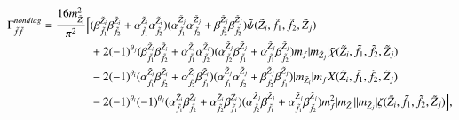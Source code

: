 \documentclass[final,3p,times]{elsarticle}
\begin{document}
\begin{equation}
\begin{aligned}
\Gamma_{\tilde{f} \tilde{f}}^{nondiag} =  {16 m_{\tilde{Z}_i}^2 \over \pi^2}\Big[&({\beta_{\tilde{f}_1}^{\tilde{Z}_i}}{\beta_{\tilde{f}_2}^{\tilde{Z}_i}} + {\alpha_{\tilde{f}_1}^{\tilde{Z}_i}}{\alpha_{\tilde{f}_2}^{\tilde{Z}_i}})({\alpha_{\tilde{f}_1}^{\tilde{Z}_j}}{\alpha_{\tilde{f}_2}^{\tilde{Z}_j}} + {\beta_{\tilde{f}_2}^{\tilde{Z}_j}}{\beta_{\tilde{f}_2}^{\tilde{Z}_j}})\tilde{\psi}(\tilde{Z}_i,\tilde{f}_1, \tilde{f}_2, \tilde{Z}_j) \\ & + 2(-1)^{\theta_j}({\beta_{\tilde{f}_1}^{\tilde{Z}_i}}{\beta_{\tilde{f}_2}^{\tilde{Z}_i}} + {\alpha_{\tilde{f}_1}^{\tilde{Z}_i}} {\alpha_{\tilde{f}_2}^{\tilde{Z}_i}})({\alpha_{\tilde{f}_2}^{\tilde{Z}_j}}{\beta_{\tilde{f}_1}^{\tilde{Z}_j}} + {\alpha_{\tilde{f}_1}^{\tilde{Z}_j}}{\beta_{\tilde{f}_2}^{\tilde{Z}_j}})m_{f} |m_{\tilde{Z}_j}| \tilde{\chi}(\tilde{Z}_i,\tilde{f}_1,\tilde{f}_2,\tilde{Z}_j) \\ & - 2(-1)^{\theta_i}({\alpha_{\tilde{f}_1}^{\tilde{Z}_i}}{\beta_{\tilde{f}_2}^{\tilde{Z}_i}} + {\alpha_{\tilde{f}_2}^{\tilde{Z}_i}}{\beta_{\tilde{f}_1}^{\tilde{Z}_i}})({\alpha_{\tilde{f}_1}^{\tilde{Z}_j}}{\alpha_{\tilde{f}_2}^{\tilde{Z}_j}} + {\beta_{\tilde{f}_2}^{\tilde{Z}_j}}{\beta_{\tilde{f}_1}^{\tilde{Z}_j}})|m_{\tilde{Z}_i}|m_{f}X(\tilde{Z}_i,\tilde{f}_1,\tilde{f}_2,\tilde{Z}_j) \\ & - 2(-1)^{\theta_i}(-1)^{\theta_j}({\alpha_{\tilde{f}_1}^{\tilde{Z}_i}}{\beta_{\tilde{f}_2}^{\tilde{Z}_i}} + {\alpha_{\tilde{f}_2}^{\tilde{Z}_i}} {\beta_{\tilde{f}_1}^{\tilde{Z}_i}})({\alpha_{\tilde{f}_2}^{\tilde{Z}_j}}{\beta_{\tilde{f}_1}^{\tilde{Z}_j}} + {\alpha_{\tilde{f}_1}^{\tilde{Z}_j}} {\beta_{\tilde{f}_2}^{\tilde{Z}_j}})m_{f}^2|m_{\tilde{Z}_i}||m_{\tilde{Z}_j}|\zeta(\tilde{Z}_i,\tilde{f}_1,\tilde{f}_2,\tilde{Z}_j)\Big],
\end{aligned}
\end{equation}
\end{document}

